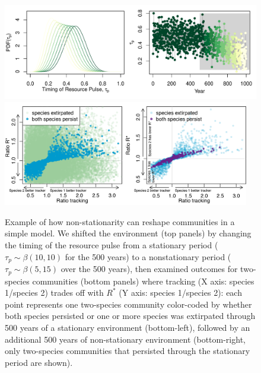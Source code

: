 \documentclass[11pt,letterpaper]{article}
\begin{document}
\begin{figure}[h!]
\centering
\includegraphics[width=1\textwidth]{..//..//..//R/graphs/modelruns/manuscript/modelsuppAlt.pdf}
\includegraphics[width=0.96\textwidth]{..//..//..//R/graphs/modelruns/manuscript/alpharstar_2panelwide_adj.png}
\caption{Example of how non-stationarity can reshape communities in a simple model. We shifted the environment (top panels) by changing the timing of the resource pulse from a stationary period ($\tau_{p} \sim \beta(10,10)$ for the 500 years) to a nonstationary period ($\tau_{p}\sim \beta(5,15)$ over the 500 years), then examined outcomes for two-species communities (bottom panels) where tracking (X axis: species 1/species 2) trades off with $R^*$ (Y axis: species 1/species 2): each point represents one two-species community color-coded by whether both species persisted or one or more species was extirpated through 500 years of a stationary environment (bottom-left), followed by an additional 500 years of non-stationary environment (bottom-right, only two-species communities that persisted through the stationary period are shown).}
\label{fig:modelfig} 
\end{figure}
\end{document}

